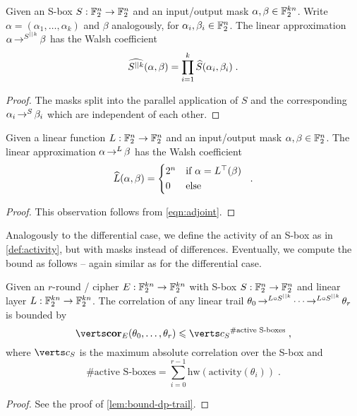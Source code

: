 \begin{lemma}
    Given an S-box $S : \mathbb{F}_2^n \to \mathbb{F}_2^n$ and an input/output mask $\alpha, \beta \in \mathbb{F}_2^{kn}$.
    Write $\alpha = (\alpha_1, \ldots, \alpha_k)$ and $\beta$ analogously, for $\alpha_i, \beta_i \in \mathbb{F}_2^n$.
    The linear approximation $\alpha \operatorname*{\rightarrow}^{S^{||k}}_{} \beta$ has the Walsh coefficient
    \begin{equation*}
        \widehat{S^{||k}}(\alpha, \beta) = \prod_{i=1}^{k} \widehat{S}(\alpha_i, \beta_i)\;.
    \end{equation*}
\end{lemma}
\begin{proof}
    The masks split into the parallel application of $S$ and the corresponding $\alpha_i \operatorname*{\rightarrow}^{S}_{} \beta_i$ which are independent of each other.
\end{proof}

\begin{lemma}
    Given a linear function $L : \mathbb{F}_2^n \to \mathbb{F}_2^n$ and an input/output mask $\alpha, \beta \in \mathbb{F}_2^n$.
    The linear approximation $\alpha \operatorname*{\rightarrow}^{L}_{} \beta$ has the Walsh coefficient
    \begin{equation*}
        \FC{L}(\alpha, \beta) = \begin{cases*}
            2^n & if $\alpha = L^\top(\beta)$ \\
            0   & else
        \end{cases*}\;.
    \end{equation*}
\end{lemma}
\begin{proof}
    This observation follows from \cref{eqn:adjoint}.
\end{proof}

Analogously to the differential case, we define the activity of an S-box as in \cref{def:activity}, but with masks instead of differences.
Eventually, we compute the bound as follows -- again similar as for the differential case.

\begin{lemma}
    Given an $r$-round \SPN/ cipher $E : \mathbb{F}_2^{kn} \to \mathbb{F}_2^{kn}$ with S-box $S : \mathbb{F}_2^n \to \mathbb{F}_2^n$ and linear layer $L : \mathbb{F}_2^{kn} \to \mathbb{F}_2^{kn}$.
    The correlation of any linear trail $\theta_0 \operatorname*{\rightarrow}^{L \circ S^{||k}}_{} \cdots \operatorname*{\rightarrow}^{L \circ S^{||k}}_{} \theta_r$ is bounded by
    \begin{equation*}
        \abs{\cor_E(\theta_0, \ldots, \theta_r)} \leqslant \abs{c_S}^{\text{\#active S-boxes}}\;,
    \end{equation*}
    where $\abs{c_S}$ is the maximum absolute correlation over the S-box and
    \begin{equation*}
        \text{\#active S-boxes} = \sum_{i=0}^{r-1} \mathrm{hw}(\mathrm{activity}(\theta_i))\;.
    \end{equation*}
\end{lemma}
\begin{proof}
    See the proof of \cref{lem:bound-dp-trail}.
\end{proof}

